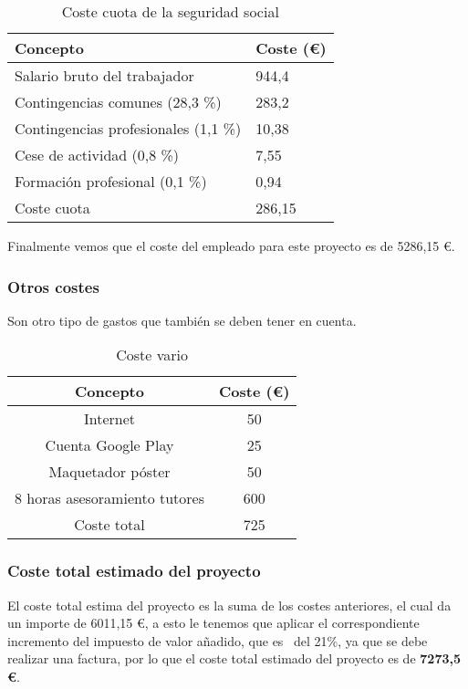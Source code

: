 \begin{table}[H]
	\begin{center}
		\begin{tabular}{ll}
			\hline
			Concepto                        	& Coste (€) \\ \hline
			Salario bruto del trabajador    	& 944,4      \\
			Contingencias comunes (28,3 \%) 	& 283,2     \\
			Contingencias profesionales (1,1 \%) & 10,38     \\
			Cese de actividad (0,8 \%)          & 7,55        \\
			Formación profesional (0,1 \%)  & 0,94       \\ \hline
			Coste cuota				            & 286,15 
		\end{tabular}
	\caption{Coste cuota de la seguridad social}
	\label{table:costecuota}
	\end{center}
\end{table}

Finalmente vemos que el coste del empleado para este proyecto es de 5286,15 €.

\subsubsection{Otros costes}
Son otro tipo de gastos que también se deben tener en cuenta.

\begin{table}[H]
	\begin{center}
		\begin{tabular}{cc}
			\hline
			Concepto                        & Coste (€)  	\\ \hline
			Internet					    & 50     		\\
			Cuenta Google Play				& 25			\\ 
			Maquetador póster				& 50     		\\
			8 horas asesoramiento tutores   & 600		\\ \hline
			Coste total            	 		& 725			\\ \hline
		\end{tabular}
		\caption{Coste vario}
		\label{table:costevario}
	\end{center}
\end{table}

\subsubsection{Coste total estimado del proyecto}
El coste total estima del proyecto es la suma de los costes anteriores, el cual da un importe de 6011,15 €, a esto le tenemos que aplicar el correspondiente incremento del impuesto de valor añadido, que es~\cite{noauthor_freelancercom_2020} del 21\%, ya que se debe realizar una factura, por lo que el coste total estimado del proyecto es de \textbf{7273,5 €}.

